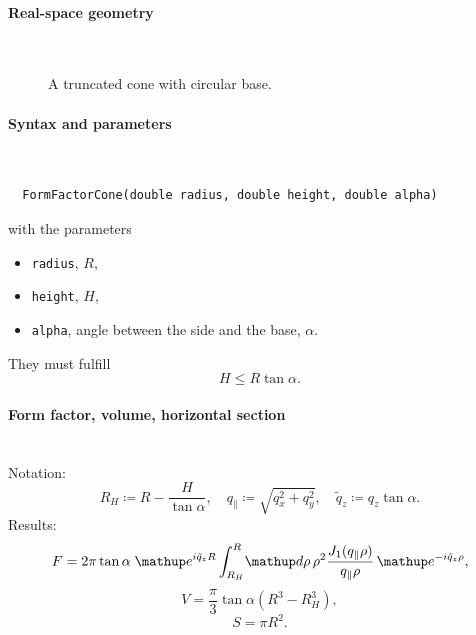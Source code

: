  \label{SCone}

\paragraph{Real-space geometry}\strut\\

\begin{figure}[H]
\hfill
{}
\hfill
{}
\hfill
{}
\hfill
\caption{A truncated cone with circular base.}
\end{figure}

\paragraph{Syntax and parameters}\strut\\[-2ex plus .2ex minus .2ex]
\begin{lstlisting}
  FormFactorCone(double radius, double height, double alpha)
\end{lstlisting}
with the parameters
\begin{itemize}
\item \texttt{radius}, $R$,
\item \texttt{height}, $H$,
\item \texttt{alpha}, angle between the side and the base, $\alpha$.
\end{itemize}
They must fulfill
\begin{displaymath}
  H\le R\tan\alpha.
\end{displaymath}

\paragraph{Form factor, volume, horizontal section}\strut\\
Notation:
\begin{equation*}
  R_H \coloneqq R-\dfrac{H}{\tan \alpha}, \quad
  q_{\parallel} \coloneqq \sqrt{q_x^2+ q_y^2}, \quad
  \tilde{q}_z \coloneqq q_z \tan\alpha.
\end{equation*}
Results:
\begin{equation*}
  F = 2\pi \tan\alpha\; \e^{i\tilde{q}_z R}
      \int_{R_H}^R \!\d\rho\, \rho^2
        \frac{J_1(q_{\parallel}\rho)}{q_{\parallel}\rho}\,\e^{-i\tilde{q}_z \rho},
\end{equation*}
\begin{equation*}
  V = \dfrac{\pi}{3}\tan\alpha  \left( R^3 - R_H^3\right),
\end{equation*}
\begin{equation*}
  S=\pi R^2.
\end{equation*}

